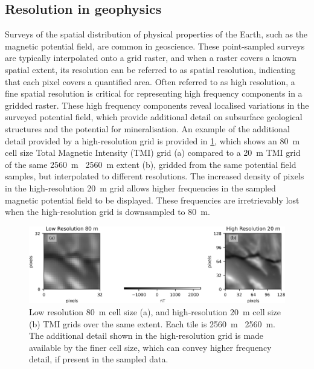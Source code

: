 \documentclass[manuscript.tex]{subfiles}
\begin{document}
\subsection{Resolution in geophysics}
\label{sec:resingeo}
Surveys of the spatial distribution of physical properties of the Earth, such as the magnetic potential field, are common in geoscience.
These point-sampled surveys are typically interpolated onto a grid raster, and when a raster covers a known spatial extent, its resolution can be referred to as spatial resolution, indicating that each pixel covers a quantified area.
Often referred to as high resolution, a fine spatial resolution is critical for representing high frequency components in a gridded raster.
These high frequency components reveal localised variations in the surveyed potential field, which provide additional detail on subsurface geological structures and the potential for mineralisation.
An example of the additional detail provided by a high-resolution grid is provided in \cref{fig:lrandhr}, which shows an \SI{80}{\metre} cell size Total Magnetic Intensity (TMI) grid (a) compared to a \SI{20}{\metre} TMI grid of the same \SI{2560}{\metre} \texttimes\ \SI{2560}{\metre} extent (b), gridded from the same potential field samples, but interpolated to different resolutions.
The increased density of pixels in the high-resolution \SI{20}{\metre} grid allows higher frequencies in the sampled magnetic potential field to be displayed.
These frequencies are irretrievably lost when the high-resolution grid is downsampled to \SI{80}{\metre}.

\begin{figure}[hbt]
    \includegraphics[width=\linewidth]{fig/p1/lrandhr.jpg}
    \caption[Comparison of different resolution grids]{Low resolution \SI{80}{\metre} cell size (a), and high-resolution \SI{20}{\metre} cell size (b) TMI grids over the same extent.
        Each tile is \SI{2560}{\metre} \texttimes\ \SI{2560}{\metre}.
        The additional detail shown in the high-resolution grid is made available by the finer cell size, which can convey higher frequency detail, if present in the sampled data.}
    \label{fig:lrandhr}
\end{figure}
\end{document}
